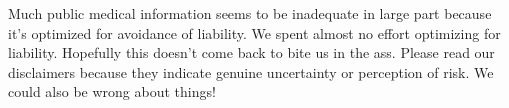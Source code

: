 \documentclass[12pt,letterpaper]{book}
\begin{document}
Much public medical information seems to be inadequate in large part because it’s optimized for avoidance of liability. We spent almost no effort optimizing for liability. Hopefully this doesn’t come back to bite us in the ass. Please read our disclaimers because they indicate genuine uncertainty or perception of risk. We could also be wrong about things!



\end{document}
